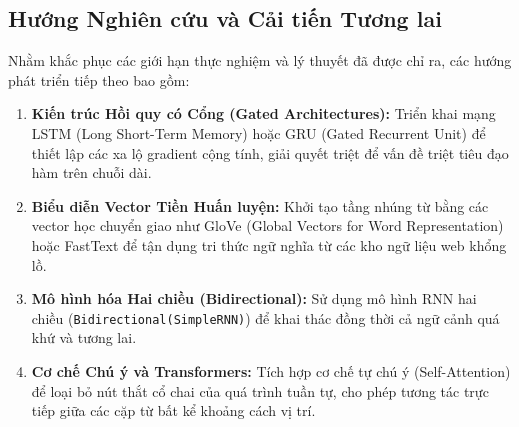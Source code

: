 \documentclass[11pt,a4paper]{article}
\begin{document}
\subsection{Hướng Nghiên cứu và Cải tiến Tương lai}
Nhằm khắc phục các giới hạn thực nghiệm và lý thuyết đã được chỉ ra, các hướng phát triển tiếp theo bao gồm:
\begin{enumerate}
    \item \textbf{Kiến trúc Hồi quy có Cổng (Gated Architectures):} Triển khai mạng LSTM (Long Short-Term Memory) hoặc GRU (Gated Recurrent Unit) để thiết lập các xa lộ gradient cộng tính, giải quyết triệt để vấn đề triệt tiêu đạo hàm trên chuỗi dài.
    \item \textbf{Biểu diễn Vector Tiền Huấn luyện:} Khởi tạo tầng nhúng từ bằng các vector học chuyển giao như GloVe (Global Vectors for Word Representation) hoặc FastText để tận dụng tri thức ngữ nghĩa từ các kho ngữ liệu web khổng lồ.
    \item \textbf{Mô hình hóa Hai chiều (Bidirectional):} Sử dụng mô hình RNN hai chiều (\texttt{Bidirectional(SimpleRNN)}) để khai thác đồng thời cả ngữ cảnh quá khứ và tương lai.
    \item \textbf{Cơ chế Chú ý và Transformers:} Tích hợp cơ chế tự chú ý (Self-Attention) để loại bỏ nút thắt cổ chai của quá trình tuần tự, cho phép tương tác trực tiếp giữa các cặp từ bất kể khoảng cách vị trí.
\end{enumerate}
\end{document}
